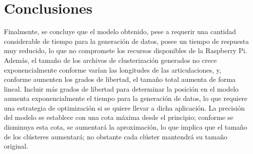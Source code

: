 \section{Conclusiones}

Finalmente, se concluye que el modelo obtenido, pese a requerir una cantidad considerable de tiempo para la generación de datos, posee un tiempo de respuesta muy reducido, lo que no compromete los recursos disponibles de la Raspberry Pi. Además, el tamaño de los archivos de clusterización generados no crece exponencialmente conforme varían las longitudes de las articulaciones, y, conforme aumenten los grados de libertad, el tamaño total aumenta de forma lineal. Incluir más grados de libertad para determinar la posición en el modelo aumenta exponencialmente el tiempo para la generación de datos, lo que requiere una estrategia de optimización si se quiere llevar a dicha aplicación. La precisión del modelo se establece con una cota máxima desde el principio; conforme se disminuya esta cota, se aumentará la aproximación, lo que implica que el tamaño de los clústeres aumentará; no obstante cada clúster mantendrá su tamaño original.